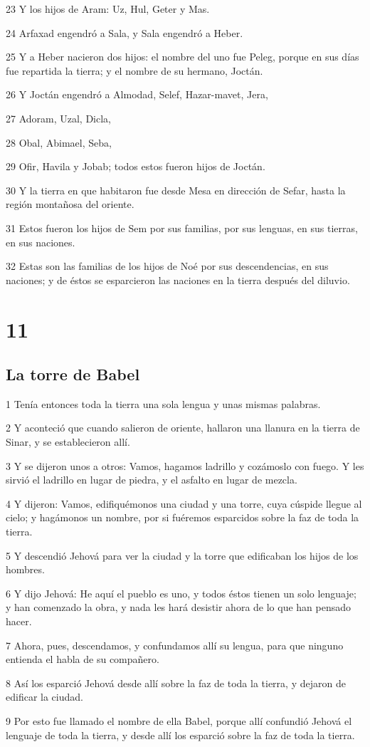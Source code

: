 \par 23 Y los hijos de Aram: Uz, Hul, Geter y Mas.
\par 24 Arfaxad engendró a Sala, y Sala engendró a Heber.
\par 25 Y a Heber nacieron dos hijos: el nombre del uno fue Peleg, porque en sus días fue repartida la tierra; y el nombre de su hermano, Joctán.
\par 26 Y Joctán engendró a Almodad, Selef, Hazar-mavet, Jera,
\par 27 Adoram, Uzal, Dicla,
\par 28 Obal, Abimael, Seba,
\par 29 Ofir, Havila y Jobab; todos estos fueron hijos de Joctán.
\par 30 Y la tierra en que habitaron fue desde Mesa en dirección de Sefar, hasta la región montañosa del oriente.
\par 31 Estos fueron los hijos de Sem por sus familias, por sus lenguas, en sus tierras, en sus naciones.
\par 32 Estas son las familias de los hijos de Noé por sus descendencias, en sus naciones; y de éstos se esparcieron las naciones en la tierra después del diluvio.

\chapter{11}

\section*{La torre de Babel}

\par 1 Tenía entonces toda la tierra una sola lengua y unas mismas palabras.
\par 2 Y aconteció que cuando salieron de oriente, hallaron una llanura en la tierra de Sinar, y se establecieron allí.
\par 3 Y se dijeron unos a otros: Vamos, hagamos ladrillo y cozámoslo con fuego. Y les sirvió el ladrillo en lugar de piedra, y el asfalto en lugar de mezcla.
\par 4 Y dijeron: Vamos, edifiquémonos una ciudad y una torre, cuya cúspide llegue al cielo; y hagámonos un nombre, por si fuéremos esparcidos sobre la faz de toda la tierra.
\par 5 Y descendió Jehová para ver la ciudad y la torre que edificaban los hijos de los hombres.
\par 6 Y dijo Jehová: He aquí el pueblo es uno, y todos éstos tienen un solo lenguaje; y han comenzado la obra, y nada les hará desistir ahora de lo que han pensado hacer.
\par 7 Ahora, pues, descendamos, y confundamos allí su lengua, para que ninguno entienda el habla de su compañero.
\par 8 Así los esparció Jehová desde allí sobre la faz de toda la tierra, y dejaron de edificar la ciudad.
\par 9 Por esto fue llamado el nombre de ella Babel, porque allí confundió Jehová el lenguaje de toda la tierra, y desde allí los esparció sobre la faz de toda la tierra.

